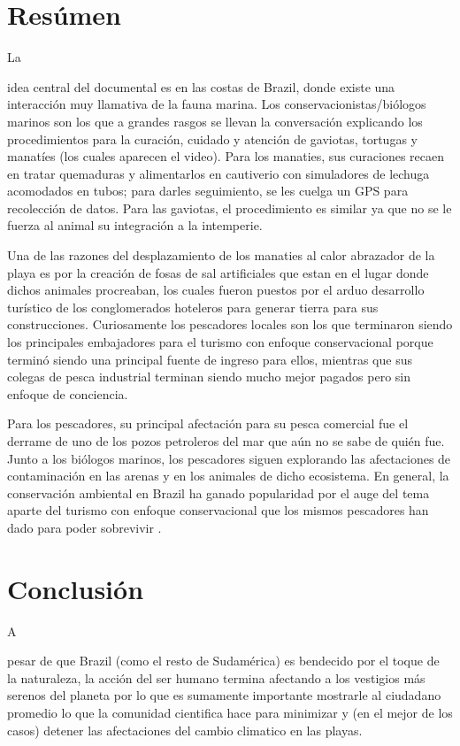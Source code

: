 \documentclass[stu, 12pt, letterpaper, donotrepeattitle, floatsintext, natbib]{apa7}
\begin{document}
\section{Resúmen}
La \begin{justifying}
    idea central del documental es en las costas de Brazil, donde existe una interacción muy llamativa de la fauna marina. Los conservacionistas/biólogos marinos son los que a grandes rasgos se llevan la
    conversación explicando los procedimientos para la curación, cuidado y atención de gaviotas, tortugas y manatíes (los cuales aparecen el video). Para los manaties, sus curaciones recaen en tratar quemaduras
    y alimentarlos en cautiverio con simuladores de lechuga acomodados en tubos; para darles seguimiento, se les cuelga un GPS para recolección de datos. Para las gaviotas, el procedimiento es similar ya que no se le fuerza al animal su integración a la intemperie.\par
    \vspace{\baselineskip}
    Una de las razones del desplazamiento de los manaties al calor abrazador de la playa es por la creación de fosas de sal artificiales que estan en el lugar donde dichos animales procreaban, los cuales fueron puestos por el 
    arduo desarrollo turístico de los conglomerados hoteleros para generar tierra para sus construcciones. Curiosamente los pescadores locales son los que terminaron siendo los principales embajadores para el turismo con enfoque
    conservacional porque terminó siendo una principal fuente de ingreso para ellos, mientras que sus colegas de pesca industrial terminan siendo mucho mejor pagados pero sin enfoque de conciencia.\par
    \vspace{\baselineskip}
    Para los pescadores, su principal afectación para su pesca comercial fue el derrame de uno de los pozos petroleros del mar que aún no se sabe de quién fue. Junto a los biólogos marinos, los pescadores siguen explorando las
    afectaciones de contaminación en las arenas y en los animales de dicho ecosistema. En general, la conservación ambiental en Brazil ha ganado popularidad por el auge del tema aparte del turismo con enfoque conservacional que los mismos
    pescadores han dado para poder sobrevivir \citep{dw-2021}.\par
    \vspace{\baselineskip}
\end{justifying}
  

\section{Conclusión}
A \begin{justifying}
    pesar de que Brazil (como el resto de Sudamérica) es bendecido por el toque de la naturaleza, la acción del ser humano termina afectando a los vestigios más serenos del planeta por lo que es sumamente importante mostrarle al ciudadano promedio lo que la comunidad cientifica hace para 
    minimizar y (en el mejor de los casos) detener las afectaciones del cambio climatico en las playas.
\end{justifying}

\newpage
\setcounter{secnumdepth}{0} %
\renewcommand\refname{\textbf{Referencias}}

\end{document}
